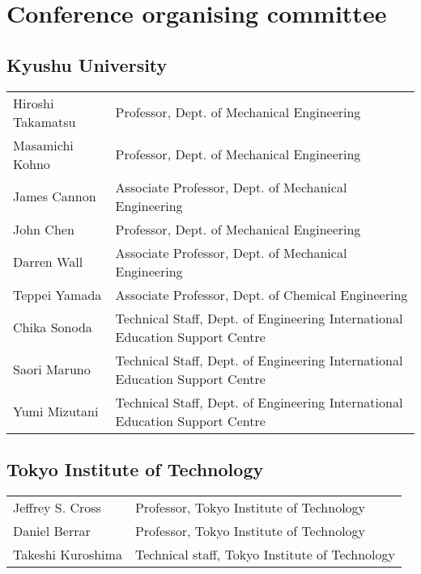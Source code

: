 \section{Conference organising committee}

\subsection*{Kyushu University}

\begin{center}
    \begin{tabular}{|l|l|}
        \hline
        Hiroshi Takamatsu & Professor, Dept. of Mechanical Engineering \\
        Masamichi Kohno & Professor, Dept. of Mechanical Engineering \\
        James Cannon & Associate Professor, Dept. of Mechanical Engineering \\
        John Chen & Professor, Dept. of Mechanical Engineering \\
        Darren Wall & Associate Professor, Dept. of Mechanical Engineering \\
        Teppei Yamada & Associate Professor, Dept. of Chemical Engineering \\
        Chika Sonoda & Technical Staff, Dept. of Engineering International Education Support Centre \\
        Saori Maruno & Technical Staff, Dept. of Engineering International Education Support Centre \\
        Yumi Mizutani & Technical Staff, Dept. of Engineering International Education Support Centre \\
        \hline
    \end{tabular}
\end{center}

\subsection*{Tokyo Institute of Technology}

\begin{center}
    \begin{tabular}{|l|l|}
        \hline
        Jeffrey S. Cross & Professor, Tokyo Institute of Technology \\
        Daniel Berrar & Professor, Tokyo Institute of Technology \\
        Takeshi Kuroshima & Technical staff, Tokyo Institute of Technology \\
        \hline
    \end{tabular}
\end{center}
